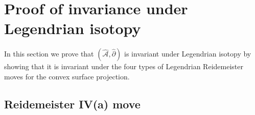 \documentclass[11pt]{amsart}
\theoremstyle{mystyle}
\newcommand{\<}{\langle}
\renewcommand{\>}{\rangle}
\begin{document}



\section{Proof of invariance under Legendrian isotopy}\label{sec:invariance}

In this section we prove that $(\widehat{\mathcal{A}}, \widehat{\partial})$ is invariant under Legendrian isotopy by showing that it is invariant under the four types of Legendrian Reidemeister moves for the convex surface projection.

\subsection{Reidemeister IV(a) move} \text{ }
\end{document}
